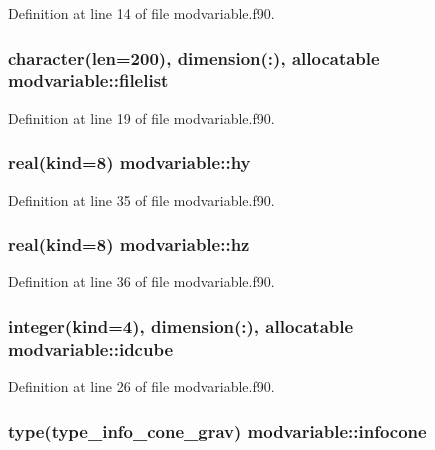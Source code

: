 Definition at line 14 of file modvariable.\-f90.

\hypertarget{classmodvariable_a73053f430f8e14a8f6c91851e02ca4c0}{
\subsubsection[{filelist}]{\setlength{\rightskip}{0pt plus 5cm}character(len=200), dimension(\-:), allocatable modvariable\-::filelist}}\label{classmodvariable_a73053f430f8e14a8f6c91851e02ca4c0}


Definition at line 19 of file modvariable.\-f90.

\hypertarget{classmodvariable_a56edfdc4b391ae52b9bcce691c5119d5}{
\subsubsection[{hy}]{\setlength{\rightskip}{0pt plus 5cm}real(kind=8) modvariable\-::hy}}\label{classmodvariable_a56edfdc4b391ae52b9bcce691c5119d5}


Definition at line 35 of file modvariable.\-f90.

\hypertarget{classmodvariable_a40a10b2561275758f13b237235540ea9}{
\subsubsection[{hz}]{\setlength{\rightskip}{0pt plus 5cm}real(kind=8) modvariable\-::hz}}\label{classmodvariable_a40a10b2561275758f13b237235540ea9}


Definition at line 36 of file modvariable.\-f90.

\hypertarget{classmodvariable_a3d2c992bfc80529f8019708135b526c1}{
\subsubsection[{idcube}]{\setlength{\rightskip}{0pt plus 5cm}integer(kind=4), dimension(\-:), allocatable modvariable\-::idcube}}\label{classmodvariable_a3d2c992bfc80529f8019708135b526c1}


Definition at line 26 of file modvariable.\-f90.

\hypertarget{classmodvariable_a90367aa0c8f20c16f78784752cc09de7}{
\subsubsection[{infocone}]{\setlength{\rightskip}{0pt plus 5cm}type(type\-\_\-info\-\_\-cone\-\_\-grav) modvariable\-::infocone}}\label{classmodvariable_a90367aa0c8f20c16f78784752cc09de7}


